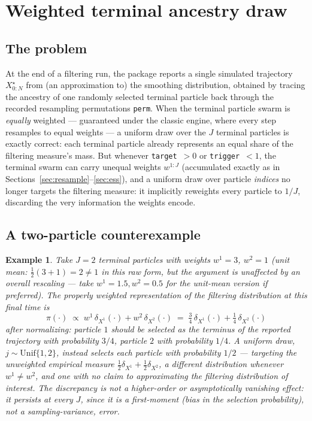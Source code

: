 \documentclass[11pt]{article}
\newtheorem{example}{Example}
\begin{document}
\section{Weighted terminal ancestry draw}
\label{sec:trace}

\subsection{The problem}

At the end of a filtering run, the package reports a single simulated
trajectory $X_{0:N}^\star$ from (an approximation to) the smoothing
distribution, obtained by tracing the ancestry of one randomly selected
terminal particle back through the recorded resampling permutations
\texttt{perm}. When the terminal particle swarm is \emph{equally} weighted —
guaranteed under the classic engine, where every step resamples to equal
weights — a uniform draw over the $J$ terminal particles is exactly correct:
each terminal particle already represents an equal share of the filtering
measure's mass. But whenever \texttt{target}~$>0$ or \texttt{trigger}~$<1$,
the terminal swarm can carry unequal weights $w^{1:J}$ (accumulated exactly
as in Sections~\ref{sec:resample}--\ref{sec:ess}), and a uniform draw over
particle \emph{indices} no longer targets the filtering measure: it
implicitly reweights every particle to $1/J$, discarding the very
information the weights encode.

\subsection{A two-particle counterexample}

\begin{example}
Take $J=2$ terminal particles with weights $w^1 = 3$, $w^2=1$ (unit mean:
$\tfrac12(3+1)=2\ne1$ in this raw form, but the argument is unaffected by an
overall rescaling — take $w^1=1.5,w^2=0.5$ for the unit-mean version if
preferred). The properly weighted representation of the filtering
distribution at this final time is
\[
\pi(\cdot) \;\propto\; w^1\,\delta_{X^1}(\cdot) + w^2\,\delta_{X^2}(\cdot)
\;=\; \tfrac34\,\delta_{X^1}(\cdot) + \tfrac14\,\delta_{X^2}(\cdot)
\]
after normalizing: particle $1$ should be selected as the terminus of the
reported trajectory with probability $3/4$, particle $2$ with probability
$1/4$. A uniform draw, $j\sim\mathrm{Unif}\{1,2\}$, instead selects each
particle with probability $1/2$ — targeting the \emph{unweighted empirical
measure} $\tfrac12\delta_{X^1}+\tfrac12\delta_{X^2}$, a different
distribution whenever $w^1\ne w^2$, and one with no claim to approximating
the filtering distribution of interest. The discrepancy is not a
higher-order or asymptotically vanishing effect: it persists at every $J$,
since it is a first-moment (bias in the selection probability), not a
sampling-variance, error.
\end{example}
\end{document}
